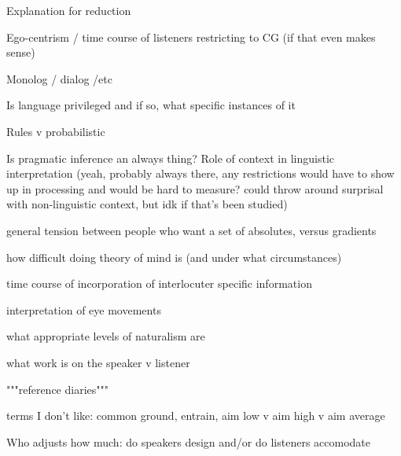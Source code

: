 \documentclass[]{article}
\begin{document}
Explanation for reduction

Ego-centrism / time course of listeners restricting to CG (if that even makes sense)

Monolog / dialog /etc 

Is language privileged and if so, what specific instances of it

Rules v probabilistic

Is pragmatic inference an always thing? Role of context in linguistic interpretation (yeah, probably always there, any restrictions would have to show up in processing and would be hard to measure? could throw around surprisal with non-linguistic context, but idk if that's been studied) 

general tension between people who want a set of absolutes, versus gradients

how difficult doing theory of mind is (and under what circumstances)

time course of incorporation of interlocuter specific information 

interpretation of eye movements

what appropriate levels of naturalism are

what work is on the speaker v listener

"""reference diaries"""

terms I don't like: common ground, entrain, aim low v aim high v aim average

Who adjusts how much: do speakers design and/or do listeners accomodate
\end{document}
